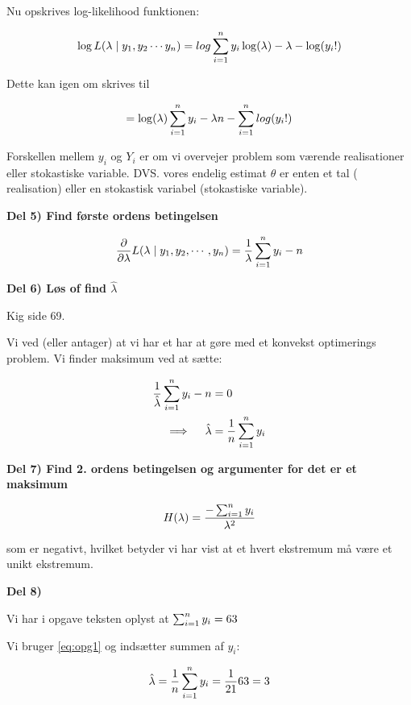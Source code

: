 Nu opskrives log-likelihood funktionen:

\begin{equation}
    \log L (\lambda \mid y_1 ,y_2 \cdots y_{n}) = log \sum_{i=1}^{n} y_i \log(\lambda) - \lambda - \log(y_i !)
\end{equation}

Dette kan igen om skrives til


\begin{equation}
     = \log(\lambda) \sum_{i=1}^{n} y_i - \lambda n - \sum_{i=1}^{n} log(y_i !)
\end{equation}

Forskellen mellem $y_i$ og $Y_i$ er om vi overvejer problem som værende realisationer eller stokastiske variable. DVS. vores endelig estimat $\hat{\theta}$ er enten et tal ( realisation) eller en stokastisk variabel (stokastiske variable).

\textbf{Del 5) Find første ordens betingelsen}

\begin{equation}
    \frac{\partial }{\partial \lambda} L (\lambda \mid y_1, y_2, \cdots, y_n) = \frac{1}{\lambda} \sum_{i=1}^{n} y_i -n
\end{equation}

\textbf{Del 6) Løs of find $\hat{\lambda} $}

Kig side 69.

Vi ved (eller antager) at vi har et har at gøre med et konvekst optimerings problem. Vi finder maksimum ved at sætte:

\begin{align}
    \frac{1}{\hat{\lambda}} \sum_{i=1}^{n} y_i -n &= 0 \\
    \implies \quad \hat{\lambda} &= \frac{1}{n}\sum_{i=1}^{n} y_i
\end{align}

\textbf{Del 7) Find 2. ordens betingelsen og argumenter for det er et maksimum}

\begin{equation}\label{eq:opg1}
    H (\lambda) = \frac{- \sum_{i=1}^{n} y_i}{\lambda^2}
\end{equation}

som er negativt, hvilket betyder vi har vist at et hvert ekstremum må være et unikt ekstremum.

\textbf{Del 8)}

 Vi har i opgave teksten oplyst at $\sum_{i=1}^{n} y_i = 63$

Vi bruger \ref{eq:opg1} og indsætter summen af $y_i$:

\begin{equation}
    \hat{\lambda} = \frac{1}{n} \sum_{i=1}^{n} y_i = \frac{1}{21} 63 = 3
\end{equation}

